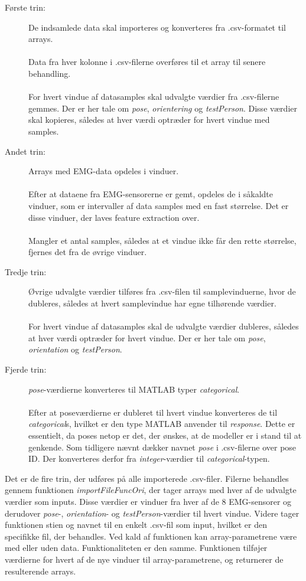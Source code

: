 \begin{description}
	\item[Første trin:] De indsamlede data skal importeres og konverteres fra .csv-formatet til arrays.\\\\
		Data fra hver kolonne i .csv-filerne overføres til et array til senere behandling.
	\\\\
	For hvert vindue af datasamples skal udvalgte værdier fra .csv-filerne gemmes. Der er her tale om \textit{pose}, \textit{orientering} og \textit{testPerson}. Disse værdier skal kopieres, således at hver værdi optræder for hvert vindue med samples.

  \item[Andet trin:] Arrays med EMG-data opdeles i vinduer. 
  \\\\
  Efter at dataene fra EMG-sensorerne er gemt, opdeles de i såkaldte vinduer, som er intervaller af data samples med en fast størrelse. Det er disse vinduer, der laves feature extraction over.
  \\\\
  Mangler et antal samples, således at et vindue ikke får den rette størrelse, fjernes det fra de øvrige vinduer. 
    \item[Tredje trin:] Øvrige udvalgte værdier tilføres fra .csv-filen til samplevinduerne, hvor de dubleres, således at hvert samplevindue har egne tilhørende værdier.
  \\\\
  For hvert vindue af datasamples skal de udvalgte værdier dubleres, således at hver værdi optræder for hvert vindue. Der er her tale om \textit{pose}, \textit{orientation} og \textit{testPerson}.
  
  \item[Fjerde trin:] \textit{pose}-værdierne konverteres til MATLAB typer \textit{categorical}.
  \\\\
  Efter at poseværdierne er dubleret til hvert vindue konverteres de til \textit{categorical}s, hvilket er den type MATLAB anvender til \textit{response}. Dette er essentielt, da poses netop er det, der ønskes, at de modeller er i stand til at genkende. Som tidligere nævnt dækker navnet \textit{pose} i .csv-filerne over pose ID. Der konverteres derfor fra \textit{integer}-værdier til \textit{categorical}-typen. 
\end{description}
Det er de fire trin, der udføres på alle importerede .csv-filer. Filerne behandles gennem funktionen \textit{importFileFuncOri}, der tager arrays med hver af de udvalgte værdier som inputs. Disse værdier er vinduer fra hver af de 8 EMG-sensorer og derudover \textit{pose}-, \textit{orientation}- og \textit{testPerson}-værdier til hvert vindue. Videre tager funktionen stien og navnet til en enkelt .csv-fil som input, hvilket er den specifikke fil, der behandles. Ved kald af funktionen kan array-parametrene være med eller uden data. Funktionaliteten er den samme. Funktionen tilføjer værdierne for hvert af de nye vinduer til array-parametrene, og returnerer de resulterende arrays. 

